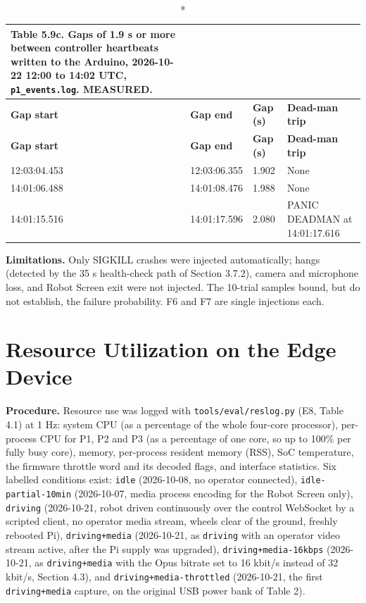 \begin{center}
\begin{longtable}{|l|l|l|p{4.5cm}|}
\caption*{Table 5.9c. Gaps of 1.9 s or more between controller heartbeats written to the Arduino, 2026-10-22 12:00 to 14:02 UTC, \texttt{p1\_events.log}. MEASURED.}
\addcontentsline{lot}{table}{\protect\numberline{5.9c}Gaps of 1.9 s or more between controller heartbeats written to the Arduino, 2026-10-22 12:00 to 14:02 UTC, \texttt{p1\_events.log}. MEASURED.}
\\
\hline
\textbf{Gap start} & \textbf{Gap end} & \textbf{Gap (s)} & \textbf{Dead-man trip} \\
\hline
\endfirsthead
\hline
\textbf{Gap start} & \textbf{Gap end} & \textbf{Gap (s)} & \textbf{Dead-man trip} \\
\hline
\endhead
12:03:04.453 & 12:03:06.355 & 1.902 & None \\
\hline
14:01:06.488 & 14:01:08.476 & 1.988 & None \\
\hline
14:01:15.516 & 14:01:17.596 & 2.080 & PANIC DEADMAN at 14:01:17.616 \\
\hline
\end{longtable}
\end{center}

\textbf{Limitations.} Only SIGKILL crashes were injected automatically; hangs (detected by the 35 s health-check path of Section 3.7.2), camera and microphone loss, and Robot Screen exit were not injected. The 10-trial samples bound, but do not establish, the failure probability. F6 and F7 are single injections each.

\section{Resource Utilization on the Edge Device}

\textbf{Procedure.} Resource use was logged with \texttt{tools/eval/reslog.py} (E8, Table 4.1) at 1 Hz: system CPU (as a percentage of the whole four-core processor), per-process CPU for P1, P2 and P3 (as a percentage of one core, so up to 100\% per fully busy core), memory, per-process resident memory (RSS), SoC temperature, the firmware throttle word and its decoded flags, and interface statistics. Six labelled conditions exist: \texttt{idle} (2026-10-08, no operator connected), \texttt{idle-partial-10min} (2026-10-07, media process encoding for the Robot Screen only), \texttt{driving} (2026-10-21, robot driven continuously over the control WebSocket by a scripted client, no operator media stream, wheels clear of the ground, freshly rebooted Pi), \texttt{driving+media} (2026-10-21, as \texttt{driving} with an operator video stream active, after the Pi supply was upgraded), \texttt{driving+media-16kbps} (2026-10-21, as \texttt{driving+media} with the Opus bitrate set to 16 kbit/s instead of 32 kbit/s, Section 4.3), and \texttt{driving+media-throttled} (2026-10-21, the first \texttt{driving+media} capture, on the original USB power bank of Table 2).

